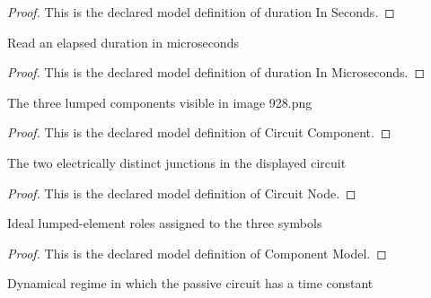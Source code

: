 \begin{proof}
  This is the declared model definition of duration In Seconds.
\end{proof}
\begin{definition}
  \label{def:physics:phyx-mini-0928:phyxminiproblems-problemphyxmini0928-durationinmicroseconds}
  Read an elapsed duration in microseconds
\end{definition}
\begin{proof}
  This is the declared model definition of duration In Microseconds.
\end{proof}
\begin{definition}
  \label{def:physics:phyx-mini-0928:phyxminiproblems-problemphyxmini0928-circuitcomponent}
  The three lumped components visible in image 928.png
\end{definition}
\begin{proof}
  This is the declared model definition of Circuit Component.
\end{proof}
\begin{definition}
  \label{def:physics:phyx-mini-0928:phyxminiproblems-problemphyxmini0928-circuitnode}
  The two electrically distinct junctions in the displayed circuit
\end{definition}
\begin{proof}
  This is the declared model definition of Circuit Node.
\end{proof}
\begin{definition}
  \label{def:physics:phyx-mini-0928:phyxminiproblems-problemphyxmini0928-componentmodel}
  Ideal lumped-element roles assigned to the three symbols
\end{definition}
\begin{proof}
  This is the declared model definition of Component Model.
\end{proof}
\begin{definition}
  \label{def:physics:phyx-mini-0928:phyxminiproblems-problemphyxmini0928-circuitregime}
  Dynamical regime in which the passive circuit has a time constant
\end{definition}
